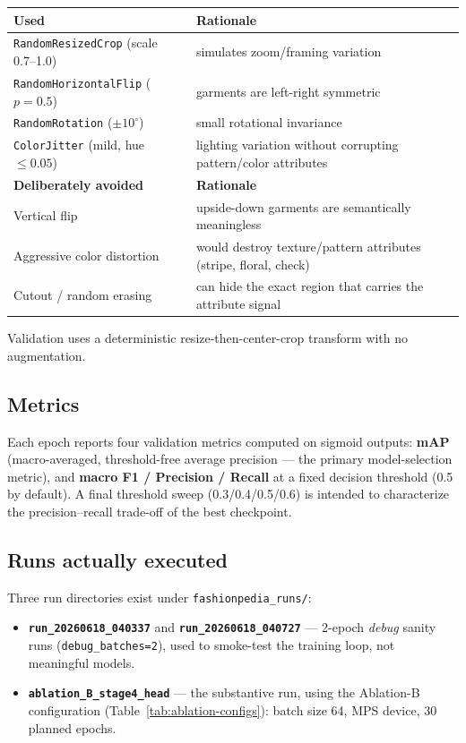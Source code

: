 \documentclass[11pt]{article}
\newcommand{\code}[1]{\texttt{\small #1}}
\begin{document}
\begin{center}
\begin{tabular}{ll}
\toprule
\textbf{Used} & \textbf{Rationale} \\
\midrule
\code{RandomResizedCrop} (scale 0.7--1.0) & simulates zoom/framing variation \\
\code{RandomHorizontalFlip} ($p{=}0.5$) & garments are left-right symmetric \\
\code{RandomRotation} ($\pm10^{\circ}$) & small rotational invariance \\
\code{ColorJitter} (mild, hue $\leq 0.05$) & lighting variation without corrupting pattern/color attributes \\
\midrule
\textbf{Deliberately avoided} & \textbf{Rationale} \\
\midrule
Vertical flip & upside-down garments are semantically meaningless \\
Aggressive color distortion & would destroy texture/pattern attributes (stripe, floral, check) \\
Cutout / random erasing & can hide the exact region that carries the attribute signal \\
\bottomrule
\end{tabular}
\end{center}

Validation uses a deterministic resize-then-center-crop transform with no augmentation.

\subsection{Metrics}

Each epoch reports four validation metrics computed on sigmoid outputs: \textbf{mAP} (macro-averaged, threshold-free average precision --- the primary model-selection metric), and \textbf{macro F1 / Precision / Recall} at a fixed decision threshold (0.5 by default). A final threshold sweep (0.3/0.4/0.5/0.6) is intended to characterize the precision--recall trade-off of the best checkpoint.

\subsection{Runs actually executed}

Three run directories exist under \code{fashionpedia\_runs/}:

\begin{itemize}
\item \textbf{\code{run\_20260618\_040337}} and \textbf{\code{run\_20260618\_040727}} --- 2-epoch \emph{debug} sanity runs (\code{debug\_batches=2}), used to smoke-test the training loop, not meaningful models.
\item \textbf{\code{ablation\_B\_stage4\_head}} --- the substantive run, using the Ablation-B configuration (Table~\ref{tab:ablation-configs}): batch size 64, MPS device, 30 planned epochs.
\end{itemize}
\end{document}
